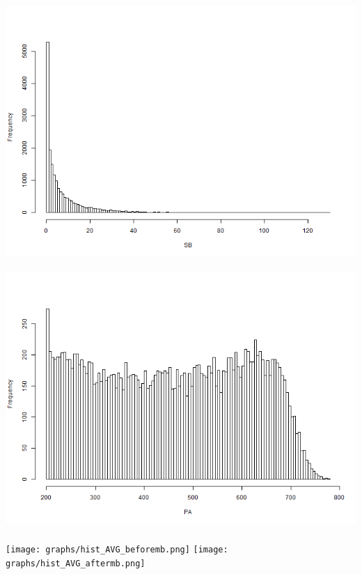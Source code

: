 \documentclass[dvipdfmx]{jsarticle}
\begin{document}
\begin{center}
  \includegraphics[width=14cm, height = 10cm]{graphs/hist_SB_all.png}
  \includegraphics[width=14cm, height = 10cm]{graphs/hist_PA_all.png}

  

  

  \texttt{[image: graphs/hist\_AVG\_beforemb.png]}
  \texttt{[image: graphs/hist\_AVG\_aftermb.png]}

\end{center}
\end{document}
